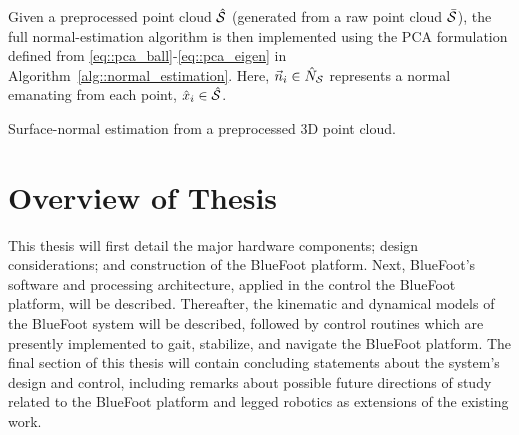 		Given a preprocessed point cloud $\hat{{\cal S}}$ (generated from a raw point cloud $\bar{{\cal S}}$), the full normal-estimation algorithm is then implemented using the PCA formulation defined from \ref{eq::pca_ball}-\ref{eq::pca_eigen} in Algorithm~\ref{alg::normal_estimation}. Here, $\vec{n}_{i} \in \hat{N}_{{\cal S}}$ represents a normal emanating from each \Ith point, $\hat{x}_{i} \in \hat{{\cal S}}$.

			\begin{algorithm}[!h]
				\begin{algorithmic}
				\EndFor
				\end{algorithmic}
				\caption{Surface-normal estimation from a preprocessed 3D point cloud.}
				\label{alg::normal_estimation}
			\end{algorithm}
		

	\section{Overview of Thesis}

		This thesis will first detail the major hardware components; design considerations; and construction of the BlueFoot platform. Next, BlueFoot's software and processing architecture, applied in the control the BlueFoot platform, will be described. Thereafter, the kinematic and dynamical models of the BlueFoot system will be described, followed by control routines which are presently implemented to gait, stabilize, and navigate the BlueFoot platform. The final section of this thesis will contain concluding statements about the system's design and control, including remarks about possible future directions of study related to the BlueFoot platform and legged robotics as extensions of the existing work.
